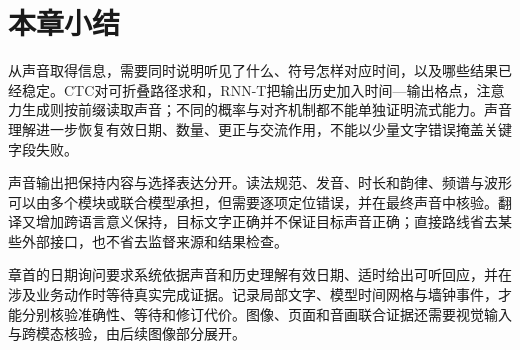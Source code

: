 \section{本章小结}
\label{sec:nlp-speech-summary}

从声音取得信息，需要同时说明听见了什么、符号怎样对应时间，以及哪些结果已经稳定。CTC对可折叠路径求和，RNN-T把输出历史加入时间—输出格点，注意力生成则按前缀读取声音；不同的概率与对齐机制都不能单独证明流式能力。声音理解进一步恢复有效日期、数量、更正与交流作用，不能以少量文字错误掩盖关键字段失败。

声音输出把保持内容与选择表达分开。读法规范、发音、时长和韵律、频谱与波形可以由多个模块或联合模型承担，但需要逐项定位错误，并在最终声音中核验。翻译又增加跨语言意义保持，目标文字正确并不保证目标声音正确；直接路线省去某些外部接口，也不省去监督来源和结果检查。

章首的日期询问要求系统依据声音和历史理解有效日期、适时给出可听回应，并在涉及业务动作时等待真实完成证据。记录局部文字、模型时间网格与墙钟事件，才能分别核验准确性、等待和修订代价。图像、页面和音画联合证据还需要视觉输入与跨模态核验，由后续图像部分展开。
